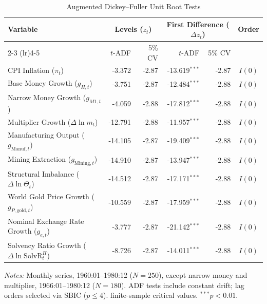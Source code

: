 \begin{table}[htbp]
	\centering
	\small
	\caption{Augmented Dickey--Fuller Unit Root Tests}
	\label{tab:adf_order_integration}
	\vspace{-1em}	
	\begin{tabular}{l r r r r c}
		\toprule
		\textbf{Variable} & \multicolumn{2}{c}{\textbf{Levels ($z_t$)}} & \multicolumn{2}{c}{\textbf{First Difference ($\Delta z_t$)}} & \textbf{Order} \\
		\cmidrule(lr){2-3} \cmidrule(lr){4-5}
		& $t$-ADF & 5\% CV & $t$-ADF & 5\% CV & \\
		\midrule
		CPI Inflation ($\pi_t$) & -3.372 & -2.87 & -13.619$^{***}$ & -2.87 & $I(0)$ \\
		Base Money Growth ($g_{H,t}$) & -3.751 & -2.87 & -12.484$^{***}$ & -2.88 & $I(0)$ \\
		Narrow Money Growth ($g_{M1,t}$) & -4.059 & -2.88 & -17.812$^{***}$ & -2.88 & $I(0)$ \\
		Multiplier Growth ($\Delta \ln m_t$) & -12.791 & -2.88 & -11.957$^{***}$ & -2.88 & $I(0)$ \\
		Manufacturing Output ($g_{\text{Manuf},t}$) & -14.105 & -2.87 & -19.409$^{***}$ & -2.88 & $I(0)$ \\
		Mining Extraction ($g_{\text{Mining},t}$) & -14.910 & -2.87 & -13.947$^{***}$ & -2.88 & $I(0)$ \\
		Structural Imbalance ($\Delta \ln \Theta_t$) & -14.512 & -2.87 & -17.171$^{***}$ & -2.88 & $I(0)$ \\
		World Gold Price Growth ($g_{P,\text{gold},t}$) & -10.559 & -2.87 & -17.959$^{***}$ & -2.88 & $I(0)$ \\
		Nominal Exchange Rate Growth ($g_{e,t}$) & -3.777 & -2.87 & -21.142$^{***}$ & -2.88 & $I(0)$ \\
		Solvency Ratio Growth ($\Delta \ln \text{SolvR}_t^H$) & -8.726 & -2.87 & -14.011$^{***}$ & -2.88 & $I(0)$ \\
		\bottomrule
	\end{tabular}
	\begin{minipage}{\linewidth}
		\vspace{0.5em}
		\footnotesize \textit{Notes:} Monthly series, 1960:01--1980:12 ($N=250$), except narrow money and multiplier, 1966:01--1980:12 ($N=180$). ADF tests include constant drift; lag orders selected via SBIC ($p \le 4$). \citet{Mackinnon1996} finite-sample critical values. $^{***} p < 0.01$.
	\end{minipage}
\end{table}